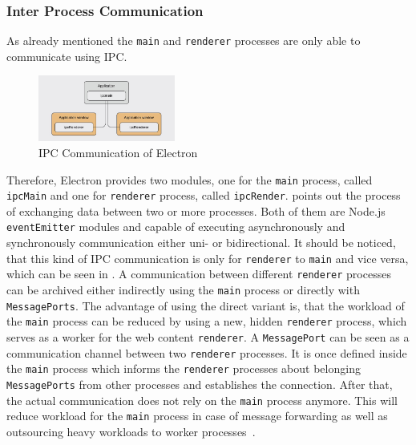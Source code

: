 \subsubsection{Inter Process Communication}
\label{subsubsec:electron:ipc}
As already mentioned the \texttt{main} and \texttt{renderer} processes are only able to communicate using \ac{IPC}.
\begin{figure}[ht]
    \centering
    \includegraphics[width=0.4\textwidth]{images/ipcElectron}
    \caption[Bla]{IPC Communication of Electron~\cite[Fig. 6.5]{electron-nwjs}}
    \label{fig:electron:ipc}
\end{figure}
Therefore, Electron provides two modules, one for the \texttt{main} process, called \texttt{ipcMain} and one for \texttt{renderer} process, called \texttt{ipcRender}.
 points out the process of exchanging data between two or more processes.
Both of them are Node.js \texttt{eventEmitter} modules and capable of executing asynchronously and synchronously communication either uni- or bidirectional.
It should be noticed, that this kind of \ac{IPC} communication is only for \texttt{renderer} to \texttt{main} and vice versa, which can be seen in .
A communication between different \texttt{renderer} processes can be archived either indirectly using the \texttt{main} process or directly with \texttt{MessagePorts}.
The advantage of using the direct variant is, that the workload of the \texttt{main} process can be reduced by using a new, hidden \texttt{renderer} process, which serves as a worker for the web content \texttt{renderer}.
A \texttt{MessagePort} can be seen as a communication channel between two \texttt{renderer} processes.
It is once defined inside the \texttt{main} process which informs the \texttt{renderer} processes about belonging \texttt{MessagePorts} from other processes and establishes the connection.
After that, the actual communication does not rely on the \texttt{main} process anymore.
This will reduce workload for the \texttt{main} process in case of message forwarding as well as outsourcing heavy workloads to worker processes~\cite{ElectronDoc}.
